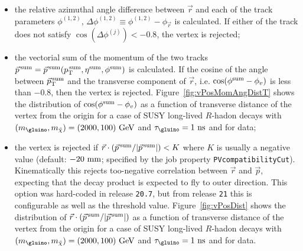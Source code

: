 \begin{itemize}
\item the relative azimuthal angle difference between $\vec{r}$ and each of the track parameters $\phi^{(1,2)}$, $\varDelta\phi^{(1,2)}\equiv \phi^{(1,2)}-\phi_{\vec{r}}$ is calculated. If either of the track does not satisfy $\cos(\varDelta\phi^{(j)})< -0.8$, the vertex is rejected;
\item the vectorial sum of the momentum of the two tracks $\vec{p}^{\rm\,sum} = \vec{p}^{\rm\,sum}(p_{\rm T}^{\rm\,sum}, \eta^{\rm sum}, \phi^{\rm sum})$ is calculated. If the cosine of the angle between $\vec{p}_{\rm T}^{\rm\,sum}$ and the transverse component of $\vec{r}$, i.e. $\cos(\phi^{\rm sum}-\phi_{v})$ is less than $-0.8$, then the vertex is rejected. Figure~\ref{fig:vPosMomAngDistT} shows the distribution of $\cos(\phi^{\rm sum}-\phi_{v})$ as a function of transverse distance of the vertex from the origin for a case of SUSY long-lived $R$-hadon decays with $(m_{\gluino}, m_{\tilde{\chi}}) = (2000, 100)~{\rm GeV}$ and $\tau_{\gluino} = 1~{\rm ns}$ and for data;
\item the vertex is rejected if $\vec{r}\cdot(\vec{p}^{\rm\,sum}/|\vec{p}^{\rm \,sum}|) < K$ where $K$ is usually a negative value (default: $-20~{\rm mm}$; specified by the job property {\tt PVcompatibilityCut}). Kinematically this rejects too-negative correlation between $\vec{r}$ and $\vec{p}$, expecting that the decay product is expected to fly to outer direction. This option was hard-coded in release {\tt 20.7}, but from release {\tt 21} this is configurable as well as the threshold value. Figure~\ref{fig:vPosDist} shows the distribution of $\vec{r}\cdot(\vec{p}^{\rm\,sum}/|\vec{p}^{\rm \,sum}|)$ as a function of transverse distance of the vertex from the origin for a case of SUSY long-lived $R$-hadon decays with $(m_{\gluino}, m_{\tilde{\chi}}) = (2000, 100)~{\rm GeV}$ and $\tau_{\gluino} = 1~{\rm ns}$ and for data.
\end{itemize}


